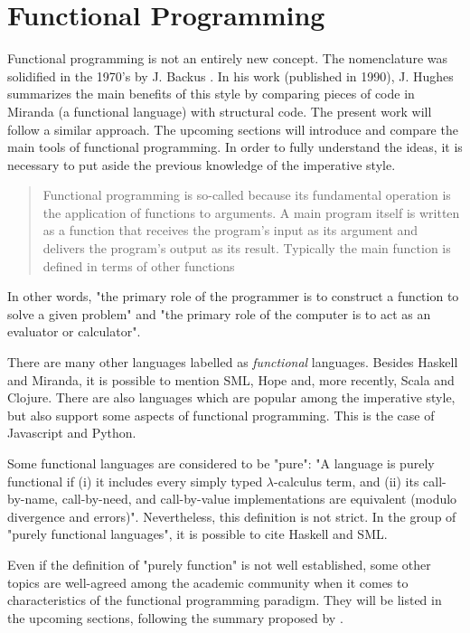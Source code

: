 \chapter{ Functional Programming }
\label{fp}

Functional programming is not an entirely new concept. The nomenclature was solidified in the 1970's by J. Backus \cite{backus1978can}. In his work \cite{hughes1989functional} (published in 1990), J. Hughes summarizes the main benefits of this style by comparing pieces of code in Miranda (a functional language) with structural code. The present work will follow a similar approach. The upcoming sections will introduce and compare the main tools of functional programming. In order to fully understand the ideas, it is necessary to put aside the previous knowledge of the imperative style.

\blockquote[\cite{hughes1989functional}]{
Functional programming is so-called because its fundamental operation is
the application of functions to arguments. A main program itself is written as
a function that receives the program's input as its argument and delivers the
program's output as its result. Typically the main function is defined in terms of
other functions
} 

In other words, "the primary role of the programmer is to construct a function to solve a given problem" \cite{birdwadler} and "the primary role of the computer is to act as an evaluator or calculator".


There are many other languages labelled as \textit{functional} languages. Besides Haskell and Miranda, it is possible to mention SML, Hope and, more recently, Scala and Clojure. There are also languages which are popular among the imperative style, but also support some aspects of functional programming. This is the case of Javascript and Python. 

Some functional languages are considered to be "pure": "A language is purely functional if (i) it includes every simply typed $\lambda$-calculus term, and (ii) its call-by-name, call-by-need, and call-by-value implementations are equivalent (modulo divergence and errors)"\cite{sabry1998}. Nevertheless, this definition is not strict. In the group of "purely functional languages", it is possible to cite Haskell and SML.

Even if the definition of "purely function" is not well established, some other topics are well-agreed among the academic community when it comes to characteristics of the functional programming paradigm. They will be listed in the upcoming sections, following the summary proposed by \cite{thompson1991type}.

